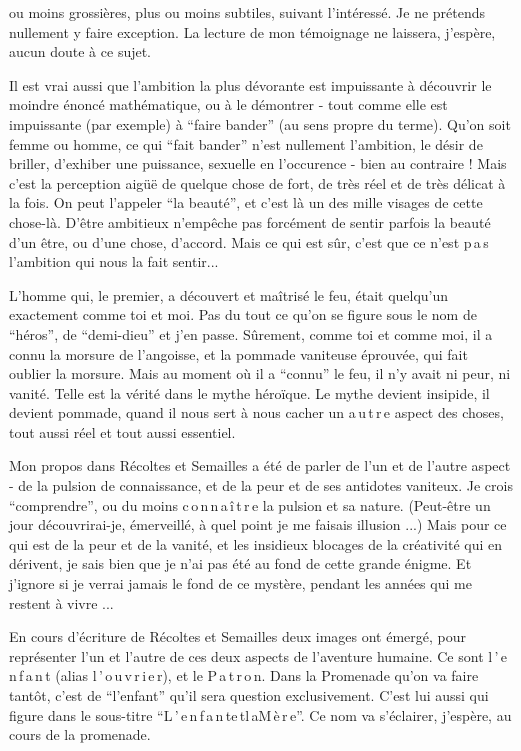 
ou moins grossières, plus ou moins subtiles, suivant l'intéressé. Je ne prétends nullement y faire exception. La lecture de mon témoignage ne laissera, j'espère, aucun doute à ce sujet.

Il est vrai aussi que l'ambition la plus dévorante est impuissante à découvrir le moindre énoncé mathématique, ou à le démontrer - tout comme elle est impuissante (par exemple) à ``faire bander'' (au sens propre du terme). Qu'on soit femme ou homme, ce qui ``fait bander'' n'est nullement l'ambition, le désir de briller, d'exhiber une puissance, sexuelle en l'occurence - bien au contraire ! Mais c'est la perception aigüë de quelque chose de fort, de très réel et de très délicat à la fois. On peut l'appeler ``la beauté'', et c'est là un des mille visages de cette chose-là. D'être ambitieux n'empêche pas forcément de sentir parfois la beauté d'un être, ou d'une chose, d'accord. Mais ce qui est sûr, c'est que ce n'est p\,a\,s l'ambition qui nous la fait sentir...

L'homme qui, le premier, a découvert et maîtrisé le feu, était quelqu'un exactement comme toi et moi. Pas du tout ce qu'on se figure sous le nom de ``héros'', de ``demi-dieu'' et j'en passe. Sûrement, comme toi et comme moi, il a connu la morsure de l'angoisse, et la pommade vaniteuse éprouvée, qui fait oublier la morsure. Mais au moment où il a ``connu'' le feu, il n'y avait ni peur, ni vanité. Telle est la vérité dans le mythe héroïque. Le mythe devient insipide, il devient pommade, quand il nous sert à nous cacher un a\,u\,t\,r\,e aspect des choses, tout aussi réel et tout aussi essentiel.

Mon propos dans Récoltes et Semailles a été de parler de l'un et de l'autre aspect - de la pulsion de connaissance, et de la peur et de ses antidotes vaniteux. Je crois ``comprendre'', ou du moins c\,o\,n\,n\,a\,î\,t\,r\,e la pulsion et sa nature. (Peut-être un jour découvrirai-je, émerveillé, à quel point je me faisais illusion ...) Mais pour ce qui est de la peur et de la vanité, et les insidieux blocages de la créativité qui en dérivent, je sais bien que je n'ai pas été au fond de cette grande énigme. Et j'ignore si je verrai jamais le fond de ce mystère, pendant les années qui me restent à vivre ...

En cours d'écriture de Récoltes et Semailles deux images ont émergé, pour représenter l'un et l'autre de ces deux aspects de l'aventure humaine. Ce sont l\,'\,e\,n\,f\,a\,n\,t (alias l\,'\,o\,u\,v\,r\,i\,e\,r), et le P\,a\,t\,r\,o\,n. Dans la Promenade qu'on va faire tantôt, c'est de ``l'enfant'' qu'il sera question  exclusivement. C'est lui aussi qui figure dans le sous-titre ``L\,'\,e\,n\,f\,a\,n\,t\quad e\,t\quad l\,a\quad M\,è\,r\,e''. Ce nom va s'éclairer, j'espère, au cours de la promenade.

